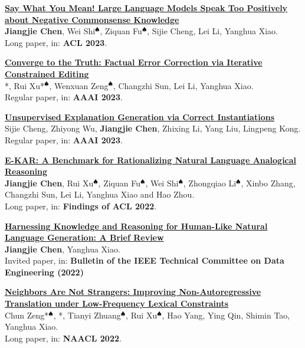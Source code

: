 \documentclass{resume}
\begin{document}
\begin{enumerate}[label={[\arabic*]}]
  \item \textbf{\href{https://jiangjiechen.github.io/publication/uncommongen/}{Say What You Mean! Large Language Models Speak Too Positively about Negative Commonsense Knowledge}}\\
  \label{paper:negation}
  \textbf{Jiangjie Chen}, Wei Shi$^\spadesuit$, Ziquan Fu$^\spadesuit$, Sijie Cheng, Lei Li, Yanghua Xiao.\\
  Long paper, in: \textbf{ACL 2023}.
  
  \item \textbf{\href{https://jiangjiechen.github.io/publication/vence/}{Converge to the Truth: Factual Error Correction via Iterative Constrained Editing}}\\
  \label{paper:vence}
  \textbf{\color{black}{Jiangjie Chen}}*, Rui Xu*$^\spadesuit$, Wenxuan Zeng$^\spadesuit$, Changzhi Sun, Lei Li, Yanghua Xiao.\\
  Regular paper, in: \textbf{AAAI 2023}. 
  
  \item \textbf{\href{https://jiangjiechen.github.io/publication/neon/}{Unsupervised Explanation Generation via Correct Instantiations}} \\
  \label{paper:neon}
  Sijie Cheng, Zhiyong Wu, \textbf{Jiangjie Chen}, Zhixing Li, Yang Liu, Lingpeng Kong.\\
  Regular paper, in: \textbf{AAAI 2023}.

  \item \textbf{\href{https://jiangjiechen.github.io/publication/ekar/}{E-KAR: A Benchmark for Rationalizing Natural Language Analogical Reasoning}}\\
  \label{paper:ekar}
  \textbf{Jiangjie Chen}, Rui Xu$^\spadesuit$, Ziquan Fu$^\spadesuit$, Wei Shi$^\spadesuit$, Zhongqiao Li$^\spadesuit$, Xinbo Zhang, Changzhi Sun, Lei Li, Yanghua Xiao and Hao Zhou. \\
  Long paper, in: \textbf{Findings of ACL 2022}.
  
  \item \textbf{\href{https://jiangjiechen.github.io/publication/tcdereview/}{Harnessing Knowledge and Reasoning for Human-Like Natural Language Generation: A Brief Review}} \\
  \label{paper:review}
  \textbf{Jiangjie Chen}, Yanghua Xiao.\\
  Invited paper, in: \textbf{Bulletin of the IEEE Technical Committee on Data Engineering (2022)}
  
  \item \textbf{\href{https://jiangjiechen.github.io/publication/act/}{Neighbors Are Not Strangers: Improving Non-Autoregressive Translation under Low-Frequency Lexical Constraints}}\\
  \label{paper:act}
  Chun Zeng*$^\spadesuit$, \textbf{\color{black}{Jiangjie Chen}}*, Tianyi Zhuang$^\spadesuit$, Rui Xu$^\spadesuit$, Hao Yang, Ying Qin, Shimin Tao, Yanghua Xiao.\\
  Long paper, in: \textbf{NAACL 2022}.
  

\end{enumerate}
\end{document}
